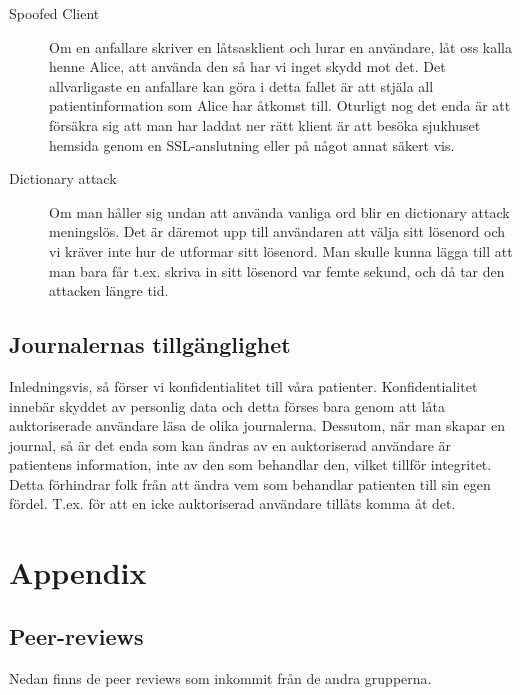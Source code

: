 \documentclass[a4paper]{article}
\begin{document}
\begin{description}

\item[Spoofed Client] Om en anfallare skriver en låtsasklient och lurar en användare, låt oss kalla henne Alice, att använda den så har vi inget skydd mot det. Det allvarligaste en anfallare kan göra i detta fallet är att stjäla all patientinformation som Alice har åtkomst till. Oturligt nog det enda är att försäkra sig att man har laddat ner rätt klient är att besöka sjukhuset hemsida genom en SSL-anslutning eller på något annat säkert vis.

\item[Dictionary attack] Om man håller sig undan att använda vanliga ord blir en dictionary attack meningslös. Det är däremot upp till användaren att välja sitt lösenord och vi kräver inte hur de utformar sitt lösenord. Man skulle kunna lägga till att man bara får t.ex. skriva in sitt lösenord var femte sekund, och då tar den attacken längre tid.

 \end{description}
 
 \subsection{Journalernas tillgänglighet}
 
Inledningsvis, så förser vi konfidentialitet till våra patienter. Konfidentialitet innebär skyddet av personlig data och detta förses bara genom att låta auktoriserade användare läsa de olika journalerna.
Dessutom, när man skapar en journal, så är det enda som kan ändras av en auktoriserad användare är patientens information, inte av den som behandlar den, vilket tillför integritet. Detta förhindrar folk från att ändra vem som behandlar patienten till sin egen fördel. T.ex. för att en icke auktoriserad användare tillåts komma åt det.

\newpage

\section{Appendix}
\subsection{Peer-reviews}
Nedan finns de peer reviews som inkommit från de andra grupperna. 




\end{document}
